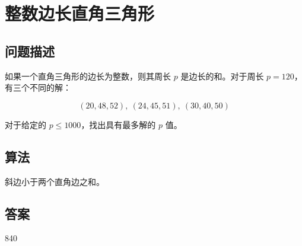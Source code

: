 \section{整数边长直角三角形}
\subsection{问题描述}
\begin{tcolorbox}

	如果一个直角三角形的边长为整数，则其周长 \( p \) 是边长的和。对于周长 \( p = 120 \)，有三个不同的解：

	\[
		(20, 48, 52),\ (24, 45, 51),\ (30, 40, 50)
	\]

	对于给定的 \( p \leq 1000 \)，找出具有最多解的 \( p \) 值。
\end{tcolorbox}

\subsection{算法}
斜边小于两个直角边之和。

\subsection{答案}
840
